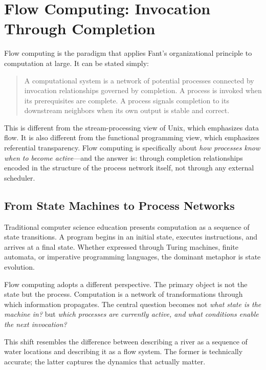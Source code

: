 \documentclass[12pt, a4paper]{article}
\begin{document}
\section{Flow Computing: Invocation Through Completion}

Flow computing is the paradigm that applies Fant's organizational
principle to computation at large. It can be stated simply:

\begin{quote}
A computational system is a network of potential processes connected
by invocation relationships governed by completion. A process is
invoked when its prerequisites are complete. A process signals
completion to its downstream neighbors when its own output is stable
and correct.
\end{quote}

This is different from the stream-processing view of Unix, which
emphasizes data flow. It is also different from the functional
programming view, which emphasizes referential transparency. Flow
computing is specifically about \emph{how processes know when to
become active}---and the answer is: through completion relationships
encoded in the structure of the process network itself, not through
any external scheduler.

\subsection{From State Machines to Process Networks}

Traditional computer science education presents computation as a
sequence of state transitions. A program begins in an initial state,
executes instructions, and arrives at a final state. Whether expressed
through Turing machines, finite automata, or imperative programming
languages, the dominant metaphor is state evolution.

Flow computing adopts a different perspective. The primary object is
not the state but the process. Computation is a network of
transformations through which information propagates. The central
question becomes not \emph{what state is the machine in?} but
\emph{which processes are currently active, and what conditions enable
the next invocation?}

This shift resembles the difference between describing a river as a
sequence of water locations and describing it as a flow system. The
former is technically accurate; the latter captures the dynamics that
actually matter.
\end{document}
